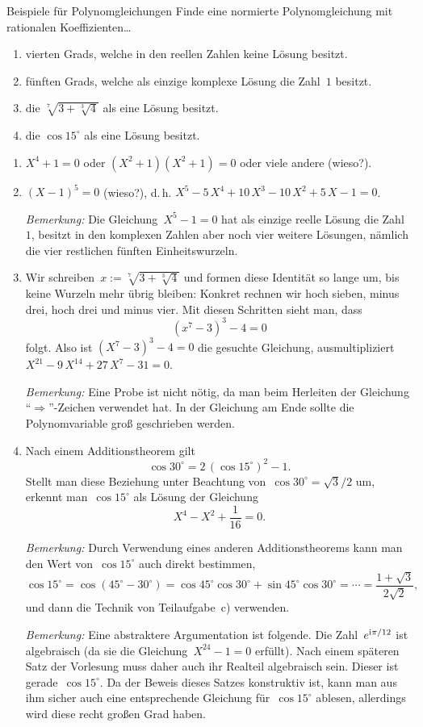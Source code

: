 \documentclass{algblatt}
\begin{document}
\ifloesungen\newpage\fi
\begin{aufgabe}{Beispiele für Polynomgleichungen}
Finde eine normierte Polynomgleichung mit rationalen Koeffizienten\ldots
\begin{enumerate}
\item vierten Grads, welche in den reellen Zahlen keine Lösung besitzt.
\item fünften Grads, welche als einzige komplexe Lösung die Zahl~$1$ besitzt.
\item die $\sqrt[7]{3 + \sqrt[3]{4}}$ als eine Lösung besitzt.
\item die $\cos 15^\circ$ als eine Lösung besitzt.
\end{enumerate}
\begin{loesung}\begin{enumerate}
\item $X^4 + 1 = 0$ oder $(X^2 + 1) (X^2 + 1) = 0$ oder viele andere (wieso?).
\item $(X - 1)^5 = 0$ (wieso?), d.\,h. $X^5-5\,X^4+10\,X^3-10\,X^2+5\,X-1 = 0$.

\emph{Bemerkung:} Die Gleichung~$X^5 - 1 = 0$ hat als einzige reelle Lösung die
Zahl~$1$, besitzt in den komplexen Zahlen aber noch vier weitere Lösungen,
nämlich die vier restlichen fünften Einheitswurzeln.
\item Wir schreiben~$x := \sqrt[7]{3 + \sqrt[3]{4}}$ und formen diese Identität
so lange um, bis keine Wurzeln mehr übrig bleiben: Konkret rechnen wir hoch
sieben, minus drei, hoch drei und minus vier. Mit diesen Schritten sieht man,
dass
\[ (x^7 - 3)^3 - 4 = 0 \]
folgt. Also ist $(X^7-3)^3-4=0$ die gesuchte Gleichung, ausmultipliziert
$X^{21}-9\,X^{14}+27\,X^7-31 = 0$.

\emph{Bemerkung:} Eine Probe ist nicht nötig, da man beim Herleiten der
Gleichung "`$\Rightarrow$"'-Zeichen verwendet hat. In der Gleichung am Ende sollte die
Polynomvariable groß geschrieben werden.
\item Nach einem Additionstheorem gilt
\[ \cos 30^\circ = 2 \, (\cos 15^\circ)^2 - 1. \]
Stellt man diese Beziehung unter Beachtung von~$\cos 30^\circ = \sqrt{3}/2$ um, erkennt man~$\cos 15^\circ$ als Lösung der
Gleichung
\[ X^4 - X^2 + \frac{1}{16} = 0. \]

\emph{Bemerkung:} Durch Verwendung eines anderen Additionstheorems kann man den
Wert von~$\cos 15^\circ$ auch direkt bestimmen,
\[ \cos 15^\circ = \cos (45^\circ - 30^\circ) =
  \cos 45^\circ \cos 30^\circ + \sin 45^\circ \cos 30^\circ = \cdots =
  \frac{1 + \sqrt{3}}{2 \sqrt{2}}, \]
und dann die Technik von Teilaufgabe~c) verwenden.

\emph{Bemerkung:} Eine abstraktere Argumentation ist folgende.
Die Zahl~$e^{\mathrm{i} \pi / 12}$ ist algebraisch (da sie die Gleichung~$X^{24} - 1 =
0$ erfüllt). Nach einem späteren Satz der Vorlesung muss daher auch ihr Realteil
algebraisch sein. Dieser ist gerade~$\cos 15^\circ$. Da der Beweis dieses Satzes
konstruktiv ist, kann man aus ihm sicher auch eine entsprechende Gleichung für~$\cos
15^\circ$ ablesen, allerdings wird diese recht großen Grad haben.
\end{enumerate}
\end{loesung}
\end{aufgabe}
\end{document}
